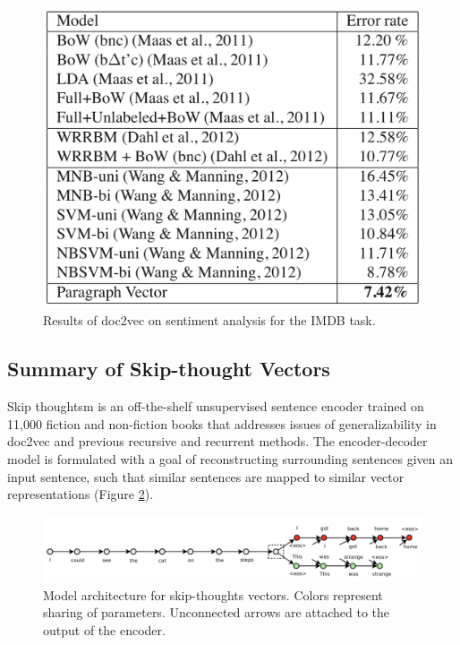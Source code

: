\begin{figure}
\centering
  \includegraphics[width=.7\linewidth]{files/doc2vec-5.png}
  \caption{Results of doc2vec on sentiment analysis for the IMDB task.}
  \label{fig:doc2vec-res2}
\end{figure}



\subsection{Summary of Skip-thought Vectors}

Skip thoughtsm\cite{DBLP:journals/corr/KirosZSZTUF15} is an off-the-shelf unsupervised sentence encoder trained on 11,000 fiction and non-fiction books that addresses issues of generalizability in doc2vec and previous recursive and recurrent methods. The encoder-decoder model is formulated with a goal of reconstructing surrounding sentences given an input sentence, such that similar sentences are mapped to similar vector representations (Figure \ref{fig:skipthoughts-1}). 

\begin{figure}[h!]
\centering
  \includegraphics[width=.8\linewidth]{files/skipthoughts-1.png}
  \caption{Model architecture for skip-thoughts vectors. Colors represent sharing of parameters. Unconnected arrows are attached to the output of the encoder.}
  \label{fig:skipthoughts-1}
\end{figure}

